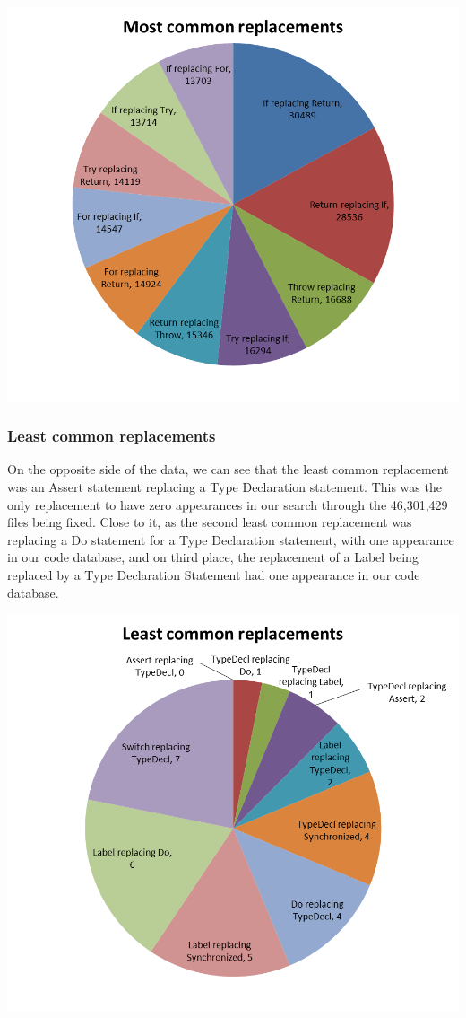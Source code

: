 \documentclass{sig-alternate-05-2015}
\begin{document}
\includegraphics[scale=0.5]{g1.png}

\subsubsection{Least common replacements}
On the opposite side of the data, we can see that the least common replacement was an Assert statement replacing a Type Declaration statement. This was the only replacement to have zero appearances in our search through the 46,301,429 files being fixed. Close to it, as the second least common replacement was replacing a Do statement for a Type Declaration statement, with one appearance in our code database, and on third place, the replacement of a Label being replaced by a Type Declaration Statement had one appearance in our code database.

\includegraphics[scale=0.5]{g2.png}
\end{document}
